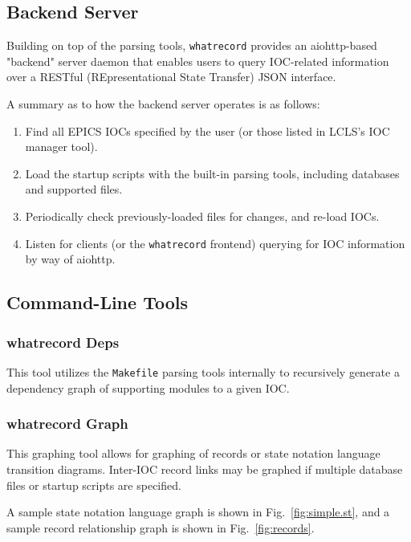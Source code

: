 \documentclass[letter,
               keeplastbox,   %
               ]{jacow}
\begin{document}
\subsection{Backend Server}

Building on top of the parsing tools, \verb_whatrecord_ provides an
aiohttp\cite{aiohttp}-based "backend" server daemon that enables users to query
IOC-related information over a RESTful (REpresentational State Transfer) JSON
interface.

A summary as to how the backend server operates is as follows:

\begin{enumerate}
  \item Find all EPICS IOCs specified by the user (or those listed in LCLS's
    IOC manager tool).
  \item Load the startup scripts with the built-in parsing tools, including
    databases and supported files.
  \item Periodically check previously-loaded files for changes, and re-load
    IOCs.
  \item Listen for clients (or the \verb_whatrecord_ frontend) querying for IOC
    information by way of aiohttp.
\end{enumerate}

\subsection{Command-Line Tools}

\subsubsection{whatrecord Deps} This tool utilizes the \verb_Makefile_ parsing
tools internally to recursively generate a dependency graph of supporting
modules to a given IOC.

\subsubsection{whatrecord Graph} This graphing tool allows for graphing of
records or state notation language transition diagrams. Inter-IOC record links
may be graphed if multiple database files or startup scripts are specified.

A sample state notation language graph is shown in Fig.~\ref{fig:simple.st},
and a sample record relationship graph is shown in Fig.~\ref{fig:records}.
\end{document}
